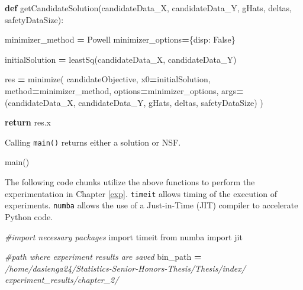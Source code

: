 \documentclass[12pt, twoside]{amherstthesis}
\newenvironment{Shaded}{\begin{snugshade}}{\end{snugshade}}
\newcommand{\CommentTok}[1]{\textcolor[rgb]{0.56,0.35,0.01}{\textit{#1}}}
\newcommand{\ControlFlowTok}[1]{\textcolor[rgb]{0.13,0.29,0.53}{\textbf{#1}}}
\newcommand{\ImportTok}[1]{#1}
\newcommand{\KeywordTok}[1]{\textcolor[rgb]{0.13,0.29,0.53}{\textbf{#1}}}
\newcommand{\NormalTok}[1]{#1}
\newcommand{\OperatorTok}[1]{\textcolor[rgb]{0.81,0.36,0.00}{\textbf{#1}}}
\newcommand{\StringTok}[1]{\textcolor[rgb]{0.31,0.60,0.02}{#1}}
\newcommand{\VariableTok}[1]{\textcolor[rgb]{0.00,0.00,0.00}{#1}}
\begin{document}
\begin{Shaded}
\begin{Highlighting}[]
\KeywordTok{def}\NormalTok{ getCandidateSolution(candidateData\_X, candidateData\_Y, gHats, }
\NormalTok{deltas, safetyDataSize):}
  
\NormalTok{    minimizer\_method }\OperatorTok{=} \StringTok{\textquotesingle{}Powell\textquotesingle{}}
\NormalTok{    minimizer\_options}\OperatorTok{=}\NormalTok{\{}\StringTok{\textquotesingle{}disp\textquotesingle{}}\NormalTok{: }\VariableTok{False}\NormalTok{\}}

\NormalTok{    initialSolution }\OperatorTok{=}\NormalTok{ leastSq(candidateData\_X, candidateData\_Y)}

\NormalTok{    res }\OperatorTok{=}\NormalTok{ minimize(}
\NormalTok{      candidateObjective, }
\NormalTok{      x0}\OperatorTok{=}\NormalTok{initialSolution, }
\NormalTok{      method}\OperatorTok{=}\NormalTok{minimizer\_method, options}\OperatorTok{=}\NormalTok{minimizer\_options, }
\NormalTok{      args}\OperatorTok{=}\NormalTok{(candidateData\_X, candidateData\_Y, gHats, deltas, }
\NormalTok{      safetyDataSize)}
\NormalTok{    )}

    \ControlFlowTok{return}\NormalTok{ res.x}
\end{Highlighting}
\end{Shaded}
\noindent Calling \texttt{main()} returns either a solution or NSF.
\begin{Shaded}
\begin{Highlighting}[]
\NormalTok{main()}
\end{Highlighting}
\end{Shaded}
\noindent The following code chunks utilize the above functions to perform the experimentation in Chapter \ref{exp}. \texttt{timeit} allows timing of the execution of experiments. \texttt{numba} allows the use of a Just-in-Time (JIT) compiler to accelerate Python code.
\begin{Shaded}
\begin{Highlighting}[]
\CommentTok{\#import necessary packages}
\ImportTok{import}\NormalTok{ timeit               }
\ImportTok{from}\NormalTok{ numba }\ImportTok{import}\NormalTok{ jit       }
\end{Highlighting}
\end{Shaded}
\begin{Shaded}
\begin{Highlighting}[]
\CommentTok{\#path where experiment results are saved}
\NormalTok{bin\_path }\OperatorTok{=} 
\CommentTok{\textquotesingle{}/home/dasienga24/Statistics{-}Senior{-}Honors{-}Thesis/Thesis/index/\textquotesingle{}}
\CommentTok{\textquotesingle{}experiment\_results/chapter\_2/\textquotesingle{}}
\end{Highlighting}
\end{Shaded}
\end{document}
